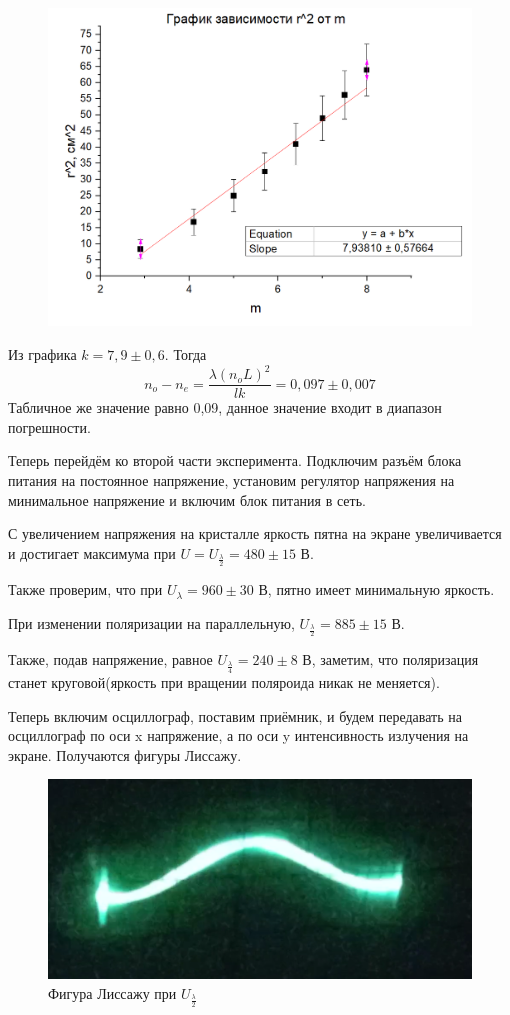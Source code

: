 \documentclass[a4paper,12pt]{article}
\begin{document}
\begin{figure}[H]
	\includegraphics[scale=0.8]{graph1.png}
\end{figure}

Из графика $k = 7,9 \pm 0,6$. Тогда
\[n_o - n_e = \frac{\lambda {(n_oL)}^2}{lk} = 0,097 \pm 0,007\]
Табличное же значение равно 0,09, данное значение входит в диапазон погрешности.

Теперь перейдём ко второй части эксперимента. 
Подключим разъём блока питания на постоянное напряжение, установим регулятор напряжения на минимальное напряжение и включим блок питания в сеть.

С увеличением напряжения на кристалле яркость пятна на экране увеличивается и достигает максимума при $U = U_{\frac{\lambda}{2}} = 480 \pm 15$ В.

Также проверим, что при $U_\lambda = 960 \pm 30$ В, пятно имеет минимальную яркость.

При изменении поляризации на параллельную, $U_{\frac{\lambda}{2}} =  885 \pm 15$ В.

Также, подав напряжение, равное $U_{\frac{\lambda}{4}} = 240 \pm 8$ В, заметим, что поляризация станет круговой(яркость при вращении поляроида никак не меняется).

Теперь включим осциллограф, поставим приёмник, и будем передавать на осциллограф по оси x напряжение, а по оси y интенсивность излучения на экране. Получаются фигуры Лиссажу.

\begin{figure}[H]
	\centering
	\includegraphics[scale=0.5]{photo2.png}
	\caption{Фигура Лиссажу при $U_{\frac{\lambda}{2}}$}
\end{figure}
\end{document}
